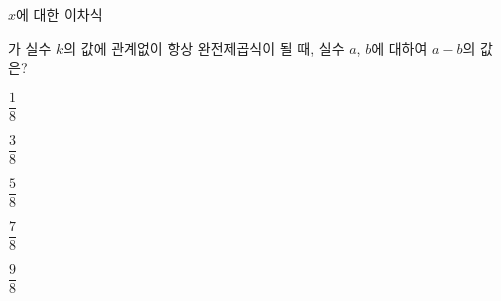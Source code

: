 $x$에 대한 이차식 \par\smallskip{}\par\smallskip\noindent 가 실수 $k$의 값에 관계없이 항상 완전제곱식이 될 때, 실수 $a$, $b$에 대하여 $a-b$의 값은?
\begin{choicesii}{\rule[-3ex]{0pt}{8ex}$\dfrac{1}{8}$}{\rule[-3ex]{0pt}{8ex}$\dfrac{3}{8}$}{\rule[-3ex]{0pt}{8ex}$\dfrac{5}{8}$}{\rule[-3ex]{0pt}{8ex}$\dfrac{7}{8}$}{\rule[-3ex]{0pt}{8ex}$\dfrac{9}{8}$}\end{choicesii}
